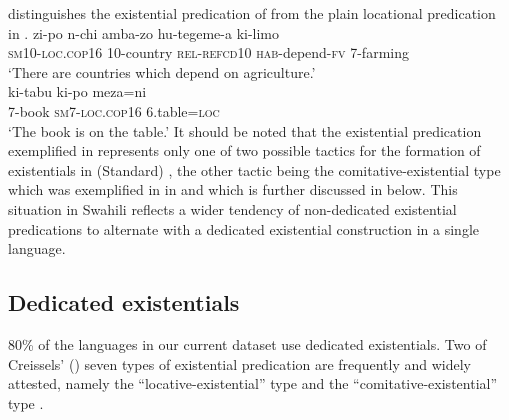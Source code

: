 \documentclass[output=paper]{langscibook}
\begin{document}
distinguishes the existential predication of 
from the plain locational predication in .
\ea\label{ex:swahili-agriculture-table}
\ea\label{ex:swahili-agriculture}
\gll zi-po n-chi amba-zo hu-tegeme-a ki-limo\\
     \textsc{sm}10-\textsc{loc.cop}16 10-country \textsc{rel-refcd}10 \textsc{hab}-depend-\textsc{fv} 7-farming\\
\glt `There are countries which depend on agriculture.'\\
\ex\label{ex:swahili-table}
\gll ki-tabu ki-po meza=ni\\
	7-book \textsc{sm7-loc.cop16} 6.table=\textsc{loc}\\
\glt `The book is on the table.'
\z\z
It should be noted that the existential predication exemplified in
 represents only one of two possible tactics
for the formation of existentials in (Standard) , the other tactic being the comitative-existential type which was exemplified in  in  and which is further discussed in  below. This situation in Swahili reflects a wider tendency of non-dedicated existential predications to alternate with a dedicated existential construction in a single language. 

\subsection{Dedicated existentials}\label{sec:1:3.2}
80\% of the languages in our current dataset use dedicated existentials. Two of Creissels' (\citeyear{Creissels2014,Creissels2015}) seven types of existential predication are frequently and widely attested, namely the ``locative-existential'' type and the ``comitative-existential'' type \citep{BernanderDevos2018}.
\end{document}
